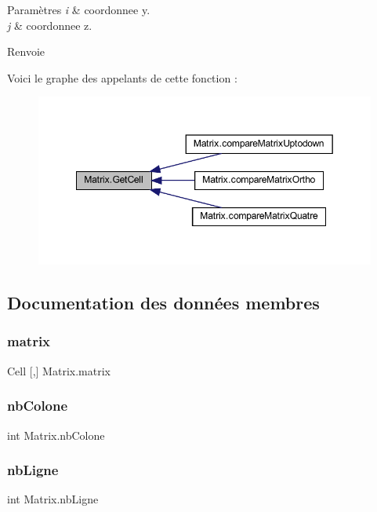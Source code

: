\begin{DoxyParams}{Paramètres}
{\em i} & coordonnee y.\\
\hline
{\em j} & coordonnee z.\\
\hline
\end{DoxyParams}
\begin{DoxyReturn}{Renvoie}

\end{DoxyReturn}
Voici le graphe des appelants de cette fonction \+:\nopagebreak
\begin{figure}[H]
\begin{center}
\leavevmode
\includegraphics[width=349pt]{class_matrix_aeb46ec5d650af142b30d0fd11f6895c3_icgraph}
\end{center}
\end{figure}


\subsection{Documentation des données membres}
\mbox{\label{class_matrix_a4733446eb00eb5c1b56955185354bc00}} 
\subsubsection{\texorpdfstring{matrix}{matrix}}
{\footnotesize\ttfamily Cell \mbox{[},\mbox{]} Matrix.\+matrix}

\mbox{\label{class_matrix_a4b79d8649f64d752e88114a86dc6a91b}} 
\subsubsection{\texorpdfstring{nb\+Colone}{nbColone}}
{\footnotesize\ttfamily int Matrix.\+nb\+Colone}

\mbox{\label{class_matrix_ac6dd4dae973f7c67ae6fd6c2938d9ac5}} 
\subsubsection{\texorpdfstring{nb\+Ligne}{nbLigne}}
{\footnotesize\ttfamily int Matrix.\+nb\+Ligne}

